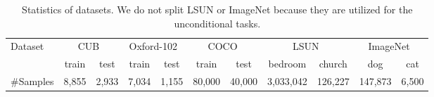 \documentclass[10pt,journal,letterpaper,compsoc]{IEEEtran}
\begin{document}
\begin{table*}[bt]
\begin{center}
\normalfont
\begin{tabular}{|l|c|c|c|c|c|c|c|c|c|c|}
\hline
 \multirow{2}{4em}{Dataset}&\multicolumn{2}{c|}{CUB~\cite{WahCUB_200_2011}}
 &\multicolumn{2}{c|}{Oxford-102~\cite{Nilsback08}}
 &\multicolumn{2}{c|}{COCO~\cite{LinMBHPRDZ14}} &\multicolumn{2}{c|}{LSUN~\cite{yu15lsun}} &\multicolumn{2}{c|}{ImageNet~\cite{ILSVRC15}} \\
\cline{2-11}
&train &test  &train &test &train &test &bedroom &church &dog &cat \\
\hline
\#Samples &8,855 &2,933 &7,034 &1,155 &80,000 &40,000 &3,033,042 &126,227 &147,873 &6,500 \\
\hline
\end{tabular}
\end{center}
\vspace{-8pt}
    \caption{Statistics of datasets. We do not split LSUN or ImageNet because they are utilized for the unconditional tasks.}
\label{tab:dataset} 
\end{table*}
\end{document}
